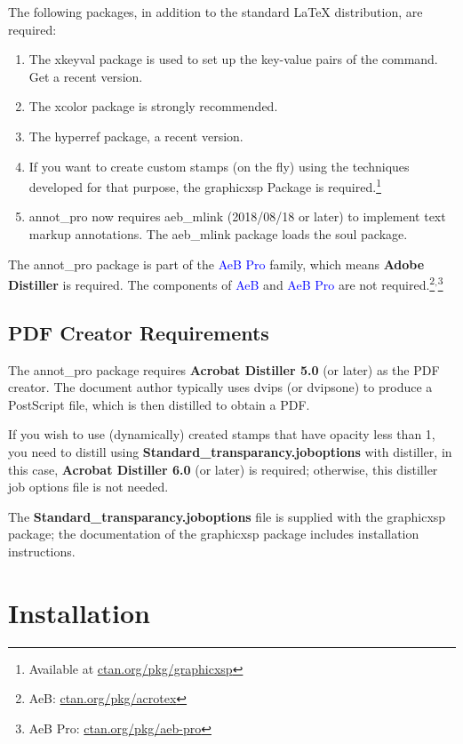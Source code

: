 \documentclass[12pt]{article}
\def\pkg{\textsf}
\begin{document}
The following packages, in addition to the standard {\LaTeX}
distribution, are required:
\begin{enumerate}
  \item The \textsf{xkeyval} package is used to set up the key-value
      pairs of the  command. Get a recent version.
  \item The \textsf{xcolor} package is strongly recommended.
  \item The \textsf{hyperref} package, a recent version.
  \item If you want to create custom stamps (on the fly) using the techniques
      developed for that purpose, the \textsf{graphicxsp} Package is required.\footnote
      {Available at \href{http://ctan.org/pkg/graphicxsp}{ctan.org/pkg/graphicxsp}}
  \item \pkg{annot\_pro} now requires \pkg{aeb\_mlink} (2018/08/18 or later) to implement
    text markup annotations. The \pkg{aeb\_mlink} package loads the \pkg{soul} package.
\end{enumerate}
The \textsf{annot\_pro} package is part of the \textcolor{blue}{AeB
Pro} family, which means \textbf{Adobe Distiller} is required. The
components of \textcolor{blue}{AeB} and \textcolor{blue}{AeB Pro}
are not required.\footnote{AeB: \href{http://ctan.org/pkg/acrotex}{ctan.org/pkg/acrotex}}${}^{,}$\footnote{AeB Pro:
\href{http://ctan.org/pkg/aeb-pro}{ctan.org/pkg/aeb-pro}}

\subsection{PDF Creator Requirements}

The \textsf{annot\_pro} package requires \textbf{Acrobat Distiller 5.0} (or
later) as the PDF creator. The document author typically uses dvips (or dvipsone) to
produce a PostScript file, which is then distilled to obtain a PDF.

If you wish to use (dynamically) created stamps that have opacity less than 1,
you need to distill using \textbf{Standard\_transparancy.joboptions} with distiller,
in this case, \textbf{Acrobat Distiller 6.0} (or later) is required; otherwise, this
distiller job options file is not needed.

The \textbf{Standard\_transparancy.joboptions} file is supplied with the \textsf{graphicxsp}
package; the documentation of the \textsf{graphicxsp} package includes installation instructions.

\section{Installation}
\end{document}
